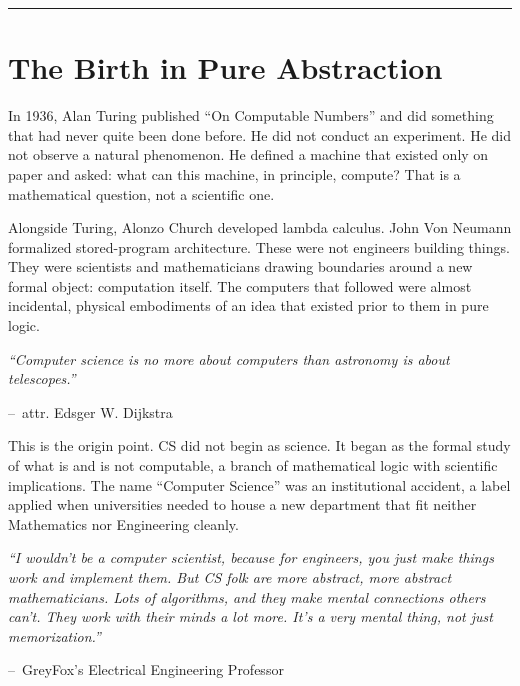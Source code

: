 \documentclass[11pt,a4paper]{article}
\renewenvironment{quote}
  {\list{}{\leftmargin=2.2em\rightmargin=2.2em\topsep=0.4em\parsep=0.3em}%
   \item\relax\itshape}
  {\endlist}
\newcommand{\attrib}[1]{\par\vspace{0.2em}\normalfont\small\hspace*{0em}--\ #1\par}
\begin{document}
\vspace{0.4em}
\noindent\rule{\textwidth}{0.4pt}

\section{The Birth in Pure Abstraction}

In 1936, Alan Turing published ``On Computable Numbers'' and did something that had never quite been done before. He did not conduct an experiment. He did not observe a natural phenomenon. He defined a machine that existed only on paper and asked: what can this machine, in principle, compute? That is a mathematical question, not a scientific one.~\cite{turing1936}

Alongside Turing, Alonzo Church developed lambda calculus. John Von Neumann formalized stored-program architecture. These were not engineers building things. They were scientists and mathematicians drawing boundaries around a new formal object: computation itself. The computers that followed were almost incidental, physical embodiments of an idea that existed prior to them in pure logic.~\cite{church1936,vonneumann1945}

\begin{quote}
``Computer science is no more about computers than astronomy is about telescopes.''
\attrib{attr. Edsger W. Dijkstra}
\end{quote}

This is the origin point. CS did not begin as science. It began as the formal study of what is and is not computable, a branch of mathematical logic with scientific implications. The name ``Computer Science'' was an institutional accident, a label applied when universities needed to house a new department that fit neither Mathematics nor Engineering cleanly.

\begin{quote}
``I wouldn't be a computer scientist, because for engineers, you just make things work and implement them. But CS folk are more abstract, more abstract mathematicians. Lots of algorithms, and they make mental connections others can't. They work with their minds a lot more. It's a very mental thing, not just memorization.''
\attrib{GreyFox's Electrical Engineering Professor}
\end{quote}

\end{document}
